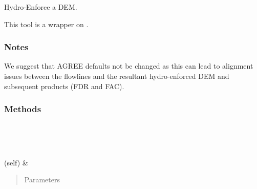 \documentclass[letterpaper,10pt,english]{sphinxmanual}
\begin{document}
\begin{fulllineitems}
\label{\detokenize{StreamStats_DataPrep:StreamStats_DataPrep.HydroDEM}}
Hydro-Enforce a DEM.

This tool is a wrapper on {\hyperref[\detokenize{make_hydrodem:make_hydrodem.hydrodem}]{}}.
\subsubsection*{Notes}

We suggest that AGREE defaults not be changed as this can lead to alignment issues between the flowlines and the resultant hydro-enforced DEM and subsequent products (FDR and FAC).
\subsubsection*{Methods}


\begin{savenotes}\sphinxatlongtablestart\begin{longtable}{}
\hline

\endfirsthead

%
{}\\
\hline

\endhead

\hline
{}\\
\endfoot

\endlastfoot

{\hyperref[\detokenize{StreamStats_DataPrep:StreamStats_DataPrep.HydroDEM.getParameterInfo}]{}}(self)
&
\begin{quote}\begin{description}
\item[{Parameters}] \leavevmode
\end{description}\end{quote}

\\
\hline
\end{longtable}\sphinxatlongtableend\end{savenotes}


\end{fulllineitems}
\end{document}
